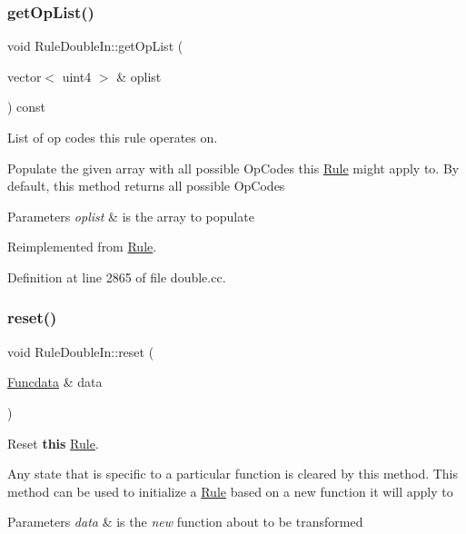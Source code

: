 \subsubsection{\texorpdfstring{getOpList()}{getOpList()}}
{\footnotesize\ttfamily void Rule\+Double\+In\+::get\+Op\+List (\begin{DoxyParamCaption}\item[{vector$<$ uint4 $>$ \&}]{oplist }\end{DoxyParamCaption}) const\hspace{0.3cm}{\ttfamily [virtual]}}



List of op codes this rule operates on. 

Populate the given array with all possible Op\+Codes this \mbox{\hyperlink{class_rule}{Rule}} might apply to. By default, this method returns all possible Op\+Codes 
\begin{DoxyParams}{Parameters}
{\em oplist} & is the array to populate \\
\hline
\end{DoxyParams}


Reimplemented from \mbox{\hyperlink{class_rule_a4023bfc7825de0ab866790551856d10e}{Rule}}.



Definition at line 2865 of file double.\+cc.

\mbox{\label{class_rule_double_in_a9feb1ec4c3183551094c745c169ee14e}} 
\subsubsection{\texorpdfstring{reset()}{reset()}}
{\footnotesize\ttfamily void Rule\+Double\+In\+::reset (\begin{DoxyParamCaption}\item[{\mbox{\hyperlink{class_funcdata}{Funcdata}} \&}]{data }\end{DoxyParamCaption})\hspace{0.3cm}{\ttfamily [virtual]}}



Reset {\bfseries{this}} \mbox{\hyperlink{class_rule}{Rule}}. 

Any state that is specific to a particular function is cleared by this method. This method can be used to initialize a \mbox{\hyperlink{class_rule}{Rule}} based on a new function it will apply to 
\begin{DoxyParams}{Parameters}
{\em data} & is the {\itshape new} function about to be transformed \\
\hline
\end{DoxyParams}


